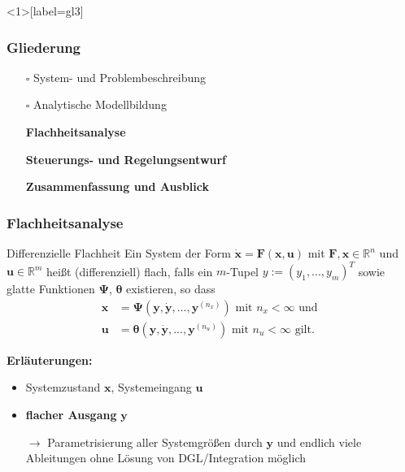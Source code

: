 \documentclass[
	ngerman,
	10pt,				%
	aspectratio=169, 	%
	xcolor=dvipsnames
]{beamer}
\newcommand{\cdbox}{$\square$\hspace{-0.65em}\raisebox{0.1em}{\checkmark}\hspace{-0.18em}}
\begin{document}

\begin{frame}<1>[label=gl3]
	\frametitle{Gliederung}
	\begin{itemize}
		\item[\cdbox] System- und Problembeschreibung
		\item[\cdbox] Analytische Modellbildung
		\item[\only<1>{$\rightarrow$}\only<2>{$\rightarrow$}\only<3->{\cdbox}]
		\textbf<1>{Flachheitsanalyse}
		\item[\only<1-2>{$\square$}\only<3>{$\rightarrow$}\only<4->{\cdbox}]
		\textbf<2>{Steuerungs- und Regelungsentwurf}
		\item[\only<1-2>{$\square$}\only<3>{$\rightarrow$}\only<4->{\cdbox}]
		\textbf<3>{Zusammenfassung und Ausblick}
	\end{itemize}
\end{frame}


\begin{frame}[label=Flachheit_1]
	\frametitle{Flachheitsanalyse}
   	\begin{block}{Differenzielle Flachheit}
	Ein System der Form $\dot{\mathbf{x}} = \mathbf{F}(\mathbf{x}, \mathbf{u})$ mit $\mathbf{F}, \mathbf{x} \in \mathbb{R}^n$ und $\mathbf{u} \in \mathbb{R}^m$ heißt (differenziell) flach, falls ein $m$-Tupel $y := (y_1, ..., y_m)^T$ sowie glatte Funktionen $\mathbf{\Psi}$, $\boldsymbol{\theta}$ existieren, so dass
	\begin{align*}
			\mathbf{x} &= \mathbf{\Psi}(\mathbf{y}, \dot{\mathbf{y}}, ..., \mathbf{y}^{(n_x)}) \text{ mit } n_x < \infty \text{ und } \\
			\mathbf{u} &= \boldsymbol{\theta}(\mathbf{y}, \dot{\mathbf{y}}, ..., \mathbf{y}^{(n_u)}) \text{ mit } n_u < \infty \text{ gilt.}
	\end{align*}
	\end{block}

	\pause
	\bigskip
	\textbf{Erläuterungen:}
	\begin{itemize}
		\item Systemzustand $\mathbf{x}$, Systemeingang $\mathbf{u}$ 
		\item \textbf{flacher Ausgang} $\mathbf{y}$
		\item[$\rightarrow$] Parametrisierung aller Systemgrößen durch $\mathbf{y}$ und endlich viele Ableitungen ohne Lösung von DGL/Integration möglich
	\end{itemize}
\end{frame}
\end{document}
